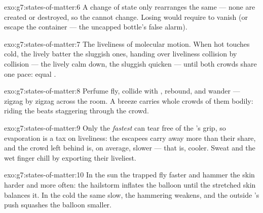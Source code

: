 \begin{solution}{exo:g7:states-of-matter:6}
A change of state only rearranges the same  --- none are
created or destroyed, so the  cannot change. Losing  would
require  to vanish (or escape the container --- the
uncapped bottle's false alarm).
\end{solution}

\begin{solution}{exo:g7:states-of-matter:7}
The liveliness of molecular motion. When hot touches cold, the
lively  batter the sluggish ones, handing over liveliness
collision by collision --- the lively calm down, the sluggish
quicken --- until both crowds share one pace: equal .
\end{solution}

\begin{solution}{exo:g7:states-of-matter:8}
Perfume  fly, collide with  , rebound, and
wander --- zigzag by zigzag across the room. A breeze carries
whole crowds of them bodily: riding the  beats staggering
through the crowd.
\end{solution}

\begin{solution}{exo:g7:states-of-matter:9}
Only the \emph{fastest}  can tear free of the 's
grip, so evaporation is a tax on liveliness: the escapees carry
away more than their share, and the crowd left behind is, on
average, slower --- that is, cooler. Sweat and the wet finger
chill by exporting their liveliest.
\end{solution}

\begin{solution}{exo:g7:states-of-matter:10}
In the sun the trapped  fly faster and hammer the skin
harder and more often: the hailstorm inflates the balloon until
the stretched skin balances it. In the cold the same 
slow, the hammering weakens, and the outside 's push squashes
the balloon smaller.
\end{solution}

